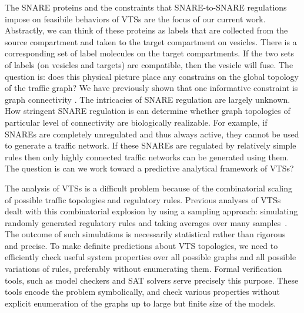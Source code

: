The SNARE proteins and the constraints that SNARE-to-SNARE regulations
impose on feasibile behaviors of VTSs are the focus of
our current work.
%
Abstractly, we can think of these proteins as labels that are
collected from the source compartment and taken to the target
compartment on vesicles.
%
There is a corresponding set of label molecules on the target compartments.
%
If the two sets of labels (on vesicles and targets) are compatible,
then the vesicle will fuse.
%
The question is: does this physical picture place any constrains on
the global topology of the traffic graph? We have previously shown
that one informative constraint is graph connectivity \cite{shukla}.
%
The intricacies of SNARE regulation are largely unknown.
%
How stringent SNARE regulation is can determine whether graph
topologies of particular level of connectivity are biologically
realizable.
%
For example, if SNAREs are completely unregulated and thus always
active, they cannot be used to generate a traffic network.
%
If these SNAREs are regulated by relatively simple rules then only
highly connected traffic networks can be generated using them.
%
The question is can we work toward a predictive analytical framework
of VTSs?

The analysis of VTSs is a difficult problem because
of the combinatorial scaling of possible traffic topologies and
regulatory rules.
%
Previous analyses of VTSs dealt with this combinatorial explosion by
using a sampling approach: simulating randomly generated regulatory
rules and taking averages over many samples~\cite{mani2016stacking}.
%
The outcome of such simulations is necessarily statistical rather than
rigorous and precise.
%
To make definite predictions about VTS topologies, we need to
efficiently check useful system properties over all possible graphs
and all possible variations of rules, preferably without enumerating
them.
%
Formal verification tools, such as model checkers
\cite{clarke1996symbolic, biere2003bounded, clarke2008birth,
cimatti2000nusmv, holzmann1997model} and SAT solvers
\cite{moskewicz2001chaff,een2004extensible} serve precisely this
purpose.
%
These tools encode the problem symbolically, and check various
properties without explicit enumeration of the graphs up to large but
finite size of the models.


